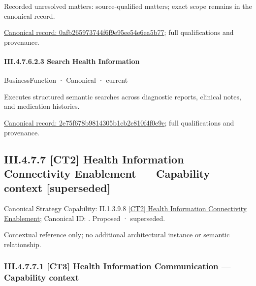 {\small Recorded unresolved matters: source-qualified matters; exact scope remains in the canonical record.}\par
{\footnotesize \href{../../../../continuum/business/business-function/0afb265973744f6f9e95ee54e6ea5b77.md}{Canonical record: 0afb265973744f6f9e95ee54e6ea5b77}; full qualifications and provenance.}\par
\paragraph*{III.4.7.6.2.3 Search Health Information}
\label{navigation:III.4.7.6.2.3}

\label{element:2e75f678b9814305b1cb2e810f4f0e9e}
{\small BusinessFunction · Canonical · current}\par

Executes structured semantic searches across diagnostic reports, clinical notes, and medication histories.


{\footnotesize \href{../../../../continuum/business/business-function/2e75f678b9814305b1cb2e810f4f0e9e.md}{Canonical record: 2e75f678b9814305b1cb2e810f4f0e9e}; full qualifications and provenance.}\par
\subsection*{III.4.7.7 [CT2] Health Information Connectivity Enablement — Capability context [superseded]}
\label{navigation:III.4.7.7}

{\small Canonical Strategy Capability: II.1.3.9.8 \hyperref[element:6a1030483dfc4ae6af6998b587129d1c]{[CT2] Health Information Connectivity Enablement}; Canonical ID: \texttt{}. Proposed · superseded.}\par
Contextual reference only; no additional architectural instance or semantic relationship.\par
\subsubsection*{III.4.7.7.1 [CT3] Health Information Communication — Capability context}
\label{navigation:III.4.7.7.1}

